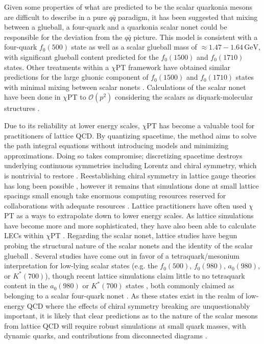 \documentclass[aps,prd,onecolumn,showpacs,amsmath,amssymb,nofootinbib]{revtex4} \pdfoutput=1
\newcommand{\cpt}{$\chi$PT}
\newcommand{\gev}{\mathrm{GeV}}
\begin{document}
Given some properties of what are predicted to be the scalar quarkonia mesons are difficult to describe in a pure $q\bar{q}$ paradigm, it has been suggested that mixing between a glueball, a four-quark and a quarkonia scalar nonet could be responsible for the deviation from the $q \bar{q}$ picture\cite{Fariborz2003}. This model is consistent with a four-quark $f_0(500)$ state as well as a scalar glueball mass of $\approx 1.47-1.64 \,\gev$, with significant glueball content predicted for the $f_0(1500)$ and $f_0(1710)$ states. Other treatments within a {\cpt} framework have obtained similar predictions for the large gluonic component of $f_0(1500)$ and $f_0(1710)$ states with minimal mixing between scalar nonets \cite{Giacosa2005}. 
Calculations of the scalar nonet have been done in {\cpt} to $\mathcal{O}(p^2)$ considering the scalars as diquark-molecular structures \cite{Xiao2008}. 

Due to its reliability at lower energy scales, {\cpt} has become a valuable tool for practitioners of lattice QCD. By quantizing spacetime, the method aims to solve the path integral equations without introducing models and minimizing approximations. Doing so takes compromise; discretizing spacetime destroys underlying continuous symmetries including Lorentz and chiral symmetry, which is nontrivial to restore \cite{walecka2004}. Reestablishing chiral symmetry in lattice gauge theories has long been possible \cite{DeGrand2007}, however it remains that simulations done at small lattice spacings small enough take enormous computing resources reserved for collaborations with adequate resources \cite{Jansen2013}. Lattice practitioners have often used {\cpt} as a ways to extrapolate down to lower energy scales. As lattice simulations have become more and more sophisticated, they have also been able to calculate LECs within {\cpt} \cite{Aoki2019}. Regarding the scalar nonet, lattice studies have begun probing the structural nature of the scalar nonets and the identity of the scalar glueball \cite{Lee:1999kv,McNeile:2000xx,Alford:2000mm,WADA2004432,Mathur2007}. Several studies have come out in favor of a tetraquark/mesonium interpretation for low-lying scalar states (e.g. the $f_0(500)$, $f_0(980)$, $a_0(980)$, or $K^{*}(700)$)\cite{Alford:2000mm,Mathur2007}, though recent lattice simulations claim little to no tetraquark content in the $a_0(980)$ or $K^{*}(700)$ states \cite{Wagner2013}, both commonly claimed as belonging to a scalar four-quark nonet \cite{Pennington2005,Pelaez2011,Schumacher2011}. As these states exist in the realm of low-energy QCD where the effects of chiral symmetry breaking are unquestionably important, it is likely that clear predictions as to the nature of the scalar mesons from lattice QCD will require robust simulations at small quark masses, with dynamic quarks, and contributions from disconnected diagrams \cite{WADA2004432,McNeile:2007qf,Mathur2007}.
\end{document}
